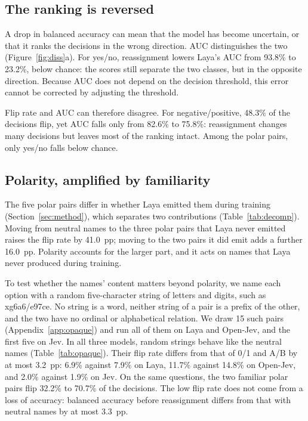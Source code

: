 \documentclass[11pt]{article}
\newcommand{\opt}[1]{\textsf{#1}}          %
\begin{document}
\begin{table}[t]
\centering\small

\caption{Flip rate (\%) of Laya by decision task.}
\label{tab:pertemplate}
\end{table}

\subsection{The ranking is reversed}
\label{sec:r2}

A drop in balanced accuracy can mean that the model has become uncertain, or that it ranks the
decisions in the wrong direction. AUC distinguishes the two (Figure~\ref{fig:diss}a). For
\opt{yes}/\opt{no}, reassignment lowers Laya's AUC from 93.8\% to 23.2\%, below chance: the scores
still separate the two classes, but in the opposite direction. Because AUC does not depend on the
decision threshold, this error cannot be corrected by adjusting the threshold.

Flip rate and AUC can therefore disagree. For \opt{negative}/\opt{positive}, 48.3\% of the decisions
flip, yet AUC falls only from 82.6\% to 75.8\%: reassignment changes many decisions but leaves most
of the ranking intact. Among the polar pairs, only \opt{yes}/\opt{no} falls below chance.

\subsection{Polarity, amplified by familiarity}
\label{sec:r4}
\label{sec:r7}

The five polar pairs differ in whether Laya emitted them during training
(Section~\ref{sec:method}), which separates two contributions (Table~\ref{tab:decomp}). Moving from
neutral names to the three polar pairs that Laya never emitted raises the flip rate by 41.0~pp;
moving to the two pairs it did emit adds a further 16.0~pp. Polarity accounts for the larger part,
and it acts on names that Laya never produced during training.

\begin{table}[t]
\centering\small

\caption{Flip rate of Laya by name class. Ranges are over the four decision tasks.}
\label{tab:decomp}
\end{table}

To test whether the names' content matters beyond polarity, we name each option with a random
five-character string of letters and digits, such as \opt{xg6a6}/\opt{e97ce}. No string is a word,
neither string of a pair is a prefix of the other, and the two have no ordinal or alphabetical
relation. We draw 15 such pairs (Appendix~\ref{app:opaque}) and run all of them on Laya and
Open-Jev, and the first five on Jev. In all three models, random strings behave like the neutral
names (Table~\ref{tab:opaque}). Their flip rate differs from that of \opt{0}/\opt{1} and
\opt{A}/\opt{B} by at most 3.2~pp: 6.9\% against 7.9\% on Laya, 11.7\% against 14.8\% on Open-Jev,
and 2.0\% against 1.9\% on Jev. On the same questions, the two familiar polar pairs flip 32.2\% to
70.7\% of the decisions. The low flip rate does not come from a loss of accuracy: balanced accuracy
before reassignment differs from that with neutral names by at most 3.3~pp.
\end{document}
